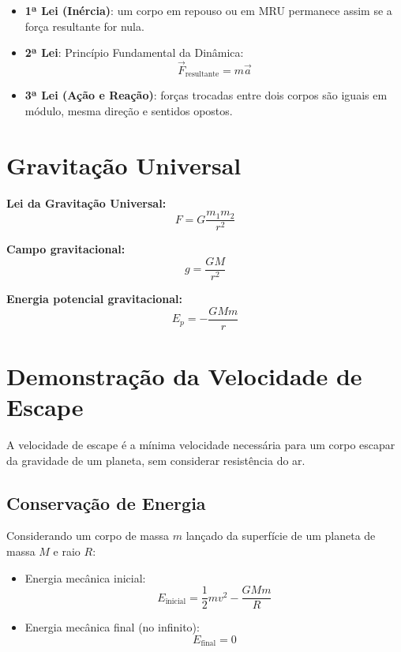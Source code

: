 \documentclass[a4paper,12pt]{article}
\begin{document}
\begin{multicols}{2}
\begin{itemize}
  \item \textbf{1ª Lei (Inércia)}: um corpo em repouso ou em MRU permanece assim se a força resultante for nula.
  \item \textbf{2ª Lei}: Princ\'ipio Fundamental da Din\^amica:
  \begin{equation*}
    \vec{F}_{\text{resultante}} = m \vec{a}
  \end{equation*}
  \item \textbf{3ª Lei (Ação e Reação)}: forças trocadas entre dois corpos são iguais em módulo, mesma direção e sentidos opostos.
\end{itemize}

\section{Gravitação Universal}

\textbf{Lei da Gravitação Universal:}
\begin{equation*}
  F = G \frac{m_1 m_2}{r^2}
\end{equation*}

\textbf{Campo gravitacional:}
\begin{equation*}
  g = \frac{G M}{r^2}
\end{equation*}

\textbf{Energia potencial gravitacional:}
\begin{equation*}
  E_p = -\frac{G M m}{r}
\end{equation*}

\section{Demonstração da Velocidade de Escape}

A velocidade de escape é a mínima velocidade necessária para um corpo escapar da gravidade de um planeta, sem considerar resistência do ar.

\subsection{Conservação de Energia}

Considerando um corpo de massa $m$ lançado da superfície de um planeta de massa $M$ e raio $R$:

\begin{itemize}
  \item Energia mecânica inicial:
  \[
  E_{\text{inicial}} = \frac{1}{2}mv^2 - \frac{GMm}{R}
  \]
  \item Energia mecânica final (no infinito): 
  \[
  E_{\text{final}} = 0
  \]
\end{itemize}


\end{multicols}
\end{document}
